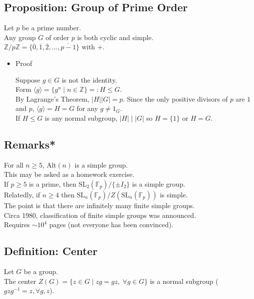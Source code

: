 \documentclass[11pt]{article}
\newcommand{\0}{\emptyset}
\newcommand{\Z}{\mathbb{Z}}
\newcommand{\F}{\mathbb{F}}
\begin{document}
\subsection*{Proposition: Group of Prime Order}
\label{sec:orgbae7ea2}
Let \(p\) be a prime number.\\[0pt]
Any group \(G\) of order \(p\) is both cyclic and simple.\\[0pt]
\(\Z/p\Z=\{\overline{0},\overline{1},\overline{2},\ldots,\overline{p-1}\}\) with \(+\).\\[0pt]
\begin{itemize}
\item Proof
\label{sec:orgb690bd7}

Suppose \(g\in G\) is not the identity.\\[0pt]
Form \(\langle g\rangle =\{g^{n}\;|\;n\in\Z\}=:H\leq G\).\\[0pt]
By Lagrange's Theorem, \(|H||G|=p\). Since the only positive divisors of \(p\) are \(1\) and \(p\), \(\langle g\rangle=H=G\) for any \(g\neq 1_{G}\).\\[0pt]
If \(H\leq G\) is any normal subgroup, \(|H|\mid|G|\) so \(H=\{1\}\) or \(H=G\).\\[0pt]
\end{itemize}
\subsection*{Remarks*}
\label{sec:orgdee3e11}
For all \(n\geq 5\), \(\text{Alt}(n)\) is a simple group.\\[0pt]
This may be asked as a homework exercise.\\[0pt]
If \(p\geq5\) is a prime, then \(\text{SL}_{2}(\F_{p})/\{\pm I_{2}\}\) is a simple group.\\[0pt]
Relatedly, if \(n\geq 4\) then \(\text{SL}_{n}(\F_{p})/Z(\text{SL}_{n}(\F_{p}))\) is simple.\\[0pt]
The point is that there are infinitely many finite simple groups.\\[0pt]
Circa 1980, classification of finite simple groups was announced.\\[0pt]
Requires \(\sim 10^{4}\) pages (not everyone has been convinced).\\[0pt]
\subsection*{Definition: Center}
\label{sec:org427f87a}
Let \(G\) be a group.\\[0pt]
The center \(Z(G)=\{z\in G\;|\;zg=gz,\;\forall g\in G\}\) is a normal subgroup (\(gzg^{-1}=z,\forall g,z\)).\\[0pt]
\end{document}
